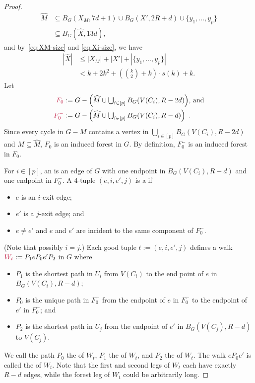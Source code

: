 \documentclass{patmorin}
\newcommand{\piotr}[1]{\textcolor{red}{Piotr: #1}}
\begin{document}
\begin{proof}
\begin{equation}
\begin{split}
\widehat{M}&\textstyle\subseteq B_G(X_M,7d+1) \cup B_G(X',2R+d) \cup \{y_1,\ldots,y_p\}\\
&\subseteq B_G(\widehat{X}, 13d), 
\end{split} 
\end{equation}
and by~\eqref{eq:XM-size} and \eqref{eq:Xi-size},  we have 
\begin{equation}
\begin{split}
|\widehat{X}|& \textstyle \leq |X_M| + |X'| + |\{y_1,\ldots,y_p\}|  \\
&\textstyle< k + 2k^2+(\binom{k}{2}+k)\cdot s(k) + k. %
\end{split} \label{x_prime_size}
\end{equation}
Let
\begin{align*}
\mathdefin{F_0}&:=\textstyle{G-\left(\widehat{M}\cup \bigcup_{i\in[p]} B_G(V(C_i),R-2d)\right)}\text{, and}\\
\mathdefin{F^-_0}&:=\textstyle{G-\left(\widehat{M}\cup \bigcup_{i\in[p]} B_G(V(C_i),R-d)\right)} \enspace . 
\end{align*}
Since every cycle in $G-M$ contains a vertex in $\bigcup_{i\in[p]} B_G(V(C_i),R-2d)$ and $M\subseteq \widehat{M}$, $F_0$ is an induced forest in $G$. By definition, $F^-_0$  is an induced forest in $F_0$.

For $i\in[p]$, an  is an edge of $G$ with one endpoint in $B_G(V(C_i),R-d)$ and one endpoint in $F_0^-$.
A $4$-tuple $(e,i,e',j)$ is a  if
\begin{itemize}[noitemsep,nosep]
  \item $e$ is an $i$-exit edge;
  \item $e'$ is a $j$-exit edge;
  and \item $e\neq e'$ and $e$ and $e'$ are incident to the same component of $F_0^-$.
\end{itemize}
(Note that possibly $i=j$.) 
Each good tuple $t:=(e,i,e',j)$  defines a walk $\mathdefin{W_t}:=P_1eP_0e'P_2$ in $G$ where
\begin{itemize}[noitemsep,nosep]
  \item $P_1$ is the shortest path in $U_i$ from $V(C_i)$ to the end point of $e$ in $B_G(V(C_i),R-d)$;
  \item $P_0$ is the unique path in $F_0^-$ from the endpoint of $e$ in $F^-_0$ to the endpoint of $e'$ in $F^-_0$; and
  \item $P_2$ is the shortest path in $U_j$ from the endpoint of $e'$ in $B_G(V(C_j),R-d)$ to $V(C_j)$.
\end{itemize}
We call the path $P_0$ the  of $W_t$, $P_1$ the  of $W_t$, and $P_2$ the  of $W_t$.  The walk $eP_0e'$ is called the  of $W_t$.  Note that the first and second legs of $W_t$ each have exactly $R-d$ edges, while the forest leg of $W_t$ could be arbitrarily long.


\end{proof}
\end{document}
